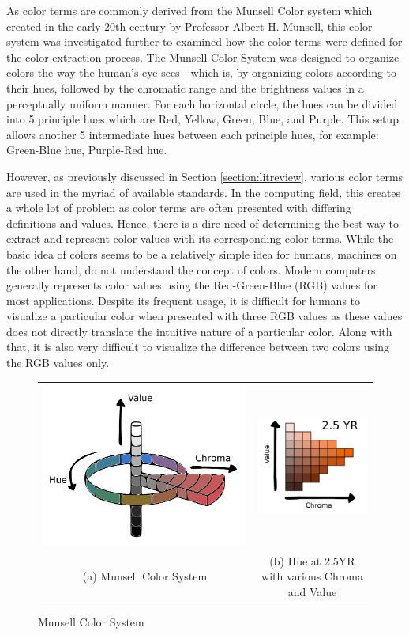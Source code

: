 As color terms are commonly derived from the Munsell Color system which created in the early 20th century by Professor Albert H. Munsell, this color system was investigated further to examined how the color terms were defined for the color extraction process. The Munsell Color System was designed to organize colors the way the human's eye sees - which is, by organizing colors according to their hues, followed by the chromatic range and the brightness values in a perceptually uniform manner. For each horizontal circle, the hues can be divided into 5 principle hues which are Red, Yellow, Green, Blue, and Purple. This setup allows another 5 intermediate hues between each principle hues, for example: Green-Blue hue, Purple-Red hue. 

However, as previously discussed in Section \ref{section:litreview}, various color terms are used in the myriad of available standards. In the computing field, this creates a whole lot of problem as color terms are often presented with differing definitions and values. Hence, there is a dire need of determining the best way to extract and represent color values with its corresponding color terms. While the basic idea of colors seems to be a relatively simple idea for humans, machines on the other hand, do not understand the concept of colors. Modern computers generally represents color values using the Red-Green-Blue (RGB) values for most applications. Despite its frequent usage, it is difficult for humans to visualize a particular color when presented with three RGB values as these values does not directly translate the intuitive nature of a particular color. Along with that, it is also very difficult to visualize the difference between two colors using the RGB values only. 


\begin{figure}[!htb]
  \centering
\begin{tabular}{cc}
 \includegraphics[width=0.4\linewidth]{image/general/munsell.png}  &
 \includegraphics[width=0.4\linewidth]{image/general/25YR.png}\\
 (a) Munsell Color System &
(b) Hue at 2.5YR with various Chroma and Value\\
\end{tabular}
\caption{Munsell Color System} \label{fig:munsell}
\end{figure}


